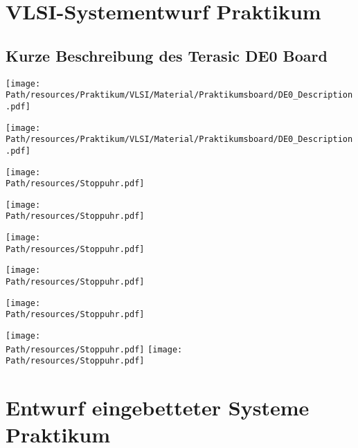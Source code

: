 \chapter{VLSI-Systementwurf Praktikum}
	\section{Kurze Beschreibung des Terasic DE0 Board}
	\begin{center}
	\texttt{[image: \\Path/resources/Praktikum/VLSI/Material/Praktikumsboard/DE0\_Description.pdf]}
	\begin{center}
	\end{center}
	\texttt{[image: \\Path/resources/Praktikum/VLSI/Material/Praktikumsboard/DE0\_Description.pdf]}
	\end{center}
	
	\def \Path {/media/Daten/Studium/Skripte/TechnischeInformatik/resources/Praktikum/VLSI/Abgabe/Protokolle}
	\begin{center}
	\texttt{[image: \\Path/resources/Stoppuhr.pdf]}
	\end{center}
	
	\begin{center}
	\texttt{[image: \\Path/resources/Stoppuhr.pdf]}
	\end{center}
	
	\begin{center}
	\texttt{[image: \\Path/resources/Stoppuhr.pdf]}
	\end{center}
	
	\begin{center}
	\texttt{[image: \\Path/resources/Stoppuhr.pdf]}
	\end{center}
	
	\begin{center}
	\texttt{[image: \\Path/resources/Stoppuhr.pdf]}
	\end{center}
	
	\begin{center}
	\texttt{[image: \\Path/resources/Stoppuhr.pdf]}
	\texttt{[image: \\Path/resources/Stoppuhr.pdf]}
	\end{center}
	
	
	\def \Path {/media/Daten/Studium/Skripte/TechnischeInformatik}


\chapter{Entwurf eingebetteter Systeme Praktikum}
	
